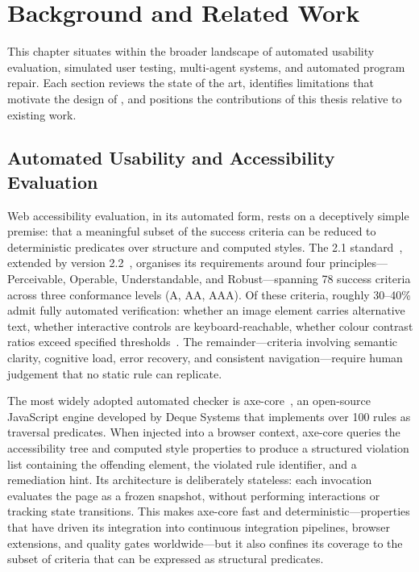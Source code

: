\chapter{Background and Related Work}
\label{ch:background}

This chapter situates \versimux{} within the broader landscape of automated usability evaluation, simulated user testing, multi-agent systems, and automated program repair. Each section reviews the state of the art, identifies limitations that motivate the design of \versimux{}, and positions the contributions of this thesis relative to existing work.


\section{Automated Usability and Accessibility Evaluation}
\label{sec:bg-accessibility}

Web accessibility evaluation, in its automated form, rests on a deceptively simple premise: that a meaningful subset of the  success criteria can be reduced to deterministic predicates over  structure and computed styles. The  2.1 standard~\cite{wcag21}, extended by version 2.2~\cite{wcag22}, organises its requirements around four principles---Perceivable, Operable, Understandable, and Robust---spanning 78 success criteria across three conformance levels (A, AA, AAA). Of these criteria, roughly 30--40\% admit fully automated verification: whether an image element carries alternative text, whether interactive controls are keyboard-reachable, whether colour contrast ratios exceed specified thresholds~\cite{abascal2004guidelines}. The remainder---criteria involving semantic clarity, cognitive load, error recovery, and consistent navigation---require human judgement that no static rule can replicate.

The most widely adopted automated checker is axe-core~\cite{axecore}, an open-source JavaScript engine developed by Deque Systems that implements over 100  rules as  traversal predicates. When injected into a browser context, axe-core queries the accessibility tree and computed style properties to produce a structured violation list containing the offending element, the violated rule identifier, and a remediation hint. Its architecture is deliberately stateless: each invocation evaluates the page as a frozen snapshot, without performing interactions or tracking state transitions. This makes axe-core fast and deterministic---properties that have driven its integration into continuous integration pipelines, browser extensions, and quality gates worldwide---but it also confines its coverage to the subset of  criteria that can be expressed as structural predicates.

